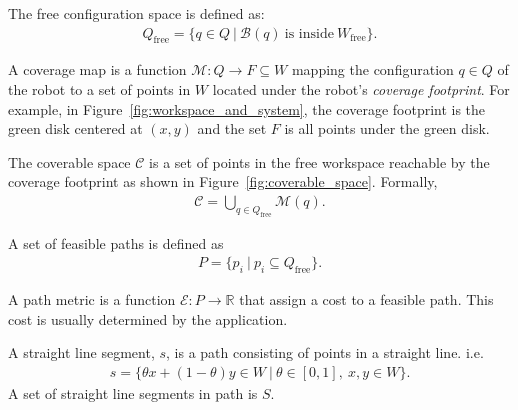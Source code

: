 \documentclass[../main.tex]{subfiles}
\begin{document}
\begin{definition}
\label{definition:free_c_space}
The free configuration space is defined as:
	\begin{equation}
	\begin{aligned}
		Q_{\text{free}}=\{q\in Q\ |\ \mathcal{B}(q)\ \text{is inside}\ W_{\text{free}}\}.
	\end{aligned}
	\end{equation}
\end{definition}

\begin{definition}
A coverage map is a function $\mathcal{M}:Q\to F\subseteq W$ mapping the configuration $q\in Q$ of the robot to a set of points in $W$ located under the robot's \emph{coverage footprint}. For example, in Figure~\ref{fig:workspace_and_system}, the coverage footprint is the green disk centered at $(x,y)$ and the set $F$ is all points under the green disk.
\end{definition}

\begin{definition}
The coverable space $\mathcal{C}$ is a set of points in the free workspace reachable by the coverage footprint as shown in Figure~\ref{fig:coverable_space}. Formally,
	\begin{equation}
	\begin{aligned}
		\mathcal{C}=\bigcup_{q\in Q_{\text{free}}}\mathcal{M}(q).
	\end{aligned}
	\end{equation}
\end{definition}

\begin{definition}
A set of feasible paths is defined as
	\begin{equation}
	\begin{aligned}
		P=\{p_i\ |\ p_i\subseteq Q_{\text{free}}\}.
	\end{aligned}
	\end{equation}
\end{definition}

\begin{definition}
A path metric is a function $\mathcal{E}:P\to\mathbb{R}$ that assign a cost to a feasible path. This cost is usually determined by the application.
\end{definition}

\begin{definition}
A straight line segment, $s$, is a path consisting of points in a straight line. i.e.
	\begin{equation}
	\begin{aligned}
		s=\{\theta x+(1-\theta)y\in W\ |\ \theta\in[0,1],\ x,y\in W\}.
	\end{aligned}
	\end{equation}
A set of straight line segments in path is $S$.
\end{definition}
\end{document}
